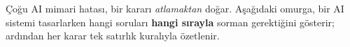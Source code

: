 

Çoğu AI mimari hatası, bir kararı \emph{atlamaktan} doğar. Aşağıdaki omurga,
bir AI sistemi tasarlarken hangi soruları \textbf{hangi sırayla} sorman
gerektiğini gösterir; ardından her karar tek satırlık kuralıyla özetlenir.

\newcommand{\dec}[2]{%
  \vspace{6pt}\par\noindent
  {\sffamily\bfseries\footnotesize\color{accent}KARAR #1}\,\,%
  {\sffamily\bfseries\small\color{ink}#2}%
  \hspace{4pt}\textcolor{hairline}{\leaders\hrule height 0.4pt\hfill}\par\vspace{2pt}}

